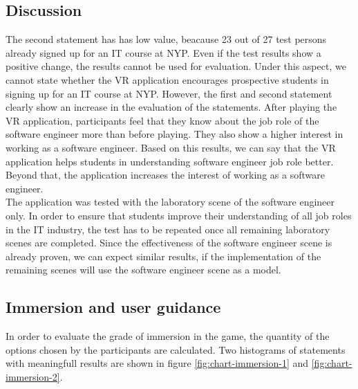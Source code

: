 \subsection{Discussion}
The second statement has has low value, beacause 23 out of 27 test persons already signed up for an IT course at NYP. Even if the test results show a positive change, the results cannot be used for evaluation. Under this aspect, we cannot state whether the VR application encourages prospective students in signing up for an IT course at NYP.
However, the first and second statement clearly show an increase in the evaluation of the statements. After playing the VR application, participants feel that they know about the job role of the software engineer more than before playing. They also show a higher interest in working as a software engineer. Based on this results, we can say that the VR application helps students in understanding software engineer job role better. Beyond that, the application increases the interest of working as a software engineer. \\
The application was tested with the laboratory scene of the software engineer only. In order to ensure that students improve their understanding of all job roles in the IT industry, the test has to be repeated once all remaining laboratory scenes are completed. Since the effectiveness of the software engineer scene is already proven, we can expect similar results, if the implementation of the remaining scenes will use the software engineer scene as a model.

\subsection{Immersion and user guidance}
In order to evaluate the grade of immersion in the game, the quantity of the options chosen by the participants are calculated. Two histograms of statements with meaningfull results are shown in figure \ref{fig:chart-immersion-1} and \ref{fig:chart-immersion-2}.

